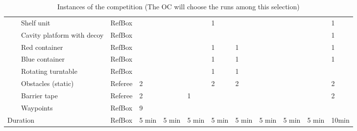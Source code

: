 \begin{landscape}
\begin{table}[h!]
\begin{tabular}{|l|l|l|l*{9}{|P{1cm}}|}
      &  & Shelf unit          & RefBox &       &       &       &   1   &       &       &       &   & 1   \\ \hhline{~~-----------}
&  & Cavity platform with decoy& RefBox &       &       &       &       &       &  \Y   &       &   & 1   \\ \hhline{~~-----------}
      &  & Red container       & RefBox &       &       &       &   1   &   1   &       &       &   & 1   \\ \hhline{~~-----------}
      &  & Blue container      & RefBox &       &       &       &   1   &   1   &       &       &   & 1   \\ \hhline{~~-----------}
      &  & Rotating turntable  & RefBox &       &       &       &   1   &   1   &       &       &   &    \\ 
    \hhline{-------------} \hhline{-------------}
     & 
     &     Obstacles (static) & Referee &  2    &       &       &   2   &   2   &       &       &   & 2   \\ \hhline{~~-----------}
     &   & Barrier tape       & Referee &  2    &       &   1   &       &       &       &       &   & 2   \\ \hhline{~~-----------}
     &   & Waypoints          & RefBox  &  9    &       &       &       &       &       &       &   &    \\ 
		\hline \hline
		 \multicolumn{3}{|l|}{Duration} 
		                    & RefBox & 5 min   & 5 min & 5 min  & 5 min & 5 min & 5 min & 5 min & 5 min & 10min \\
		\hline
 \end{tabular}
 \caption{Instances of the  competition (The OC will choose the runs among this selection)}
 \label{tab:Instances}
\end{table}
\end{landscape}


